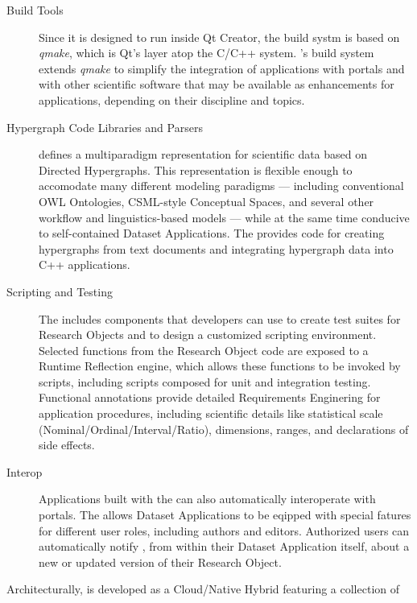 \documentclass[10pt,letterpaper]{article}
\begin{document}
\begin{description}
\item[Build Tools]  Since it is designed to run 
inside Qt Creator, the {\RAK} build systm 
is based on \textit{qmake}, which is Qt's 
layer atop the C/C++  system.  
{\lMOSAIC}'s build system extends \textit{qmake} to 
simplify the integration of {\RAK} applications 
with {\MOSAIC} portals and with other scientific 
software that may be available as enhancements 
for {\RAK} applications, depending on their 
discipline and topics.

\item[Hypergraph Code Libraries and Parsers]  
{\lMOSAIC} defines a multiparadigm representation for 
scientific data based on Directed Hypergraphs.  
This representation is flexible enough to 
accomodate many different modeling 
paradigms --- including 
conventional OWL Ontologies, 
CSML-style Conceptual Spaces, and 
several other workflow and linguistics-based models 
--- while at the same time conducive to self-contained 
Dataset Applications.  The {\MOSAIC} {\SDK} provides 
code for creating hypergraphs from text documents and 
integrating hypergraph data into C++ applications.

\item[Scripting and Testing]  The {\MOSAIC} {\SDK} includes 
components that developers can use to create 
test suites for Research Objects and to design a 
customized scripting environment.  Selected 
functions from the Research Object code are exposed 
to a Runtime Reflection engine, which allows these 
functions to be invoked by scripts, including 
scripts composed for unit and integration testing.  
Functional annotations provide detailed Requirements 
Enginering for application procedures, including scientific 
details like statistical scale (Nominal/Ordinal/Interval/Ratio),
dimensions, ranges, and declarations of side effects.

\item[{\lMOSAIC} Interop]  Applications built 
with the {\MOSAIC} {\SDK} can also automatically 
interoperate with {\MOSAIC} portals.  The {\SDK} 
allows Dataset Applications to be eqipped 
with special fatures for different user roles, 
including authors and editors.  Authorized 
users can automatically notify {\MOSAIC}, 
from within their Dataset Application itself, about 
a new or updated version of their Research Object.
\end{description}
\p{}
Architecturally, {\MOSAIC} is developed as a 
Cloud/Native Hybrid featuring a collection of 
\end{document}
